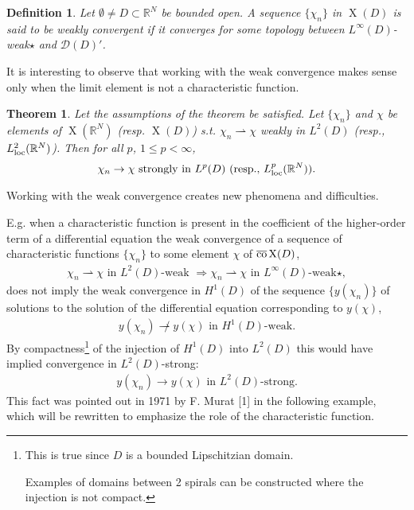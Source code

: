 \documentclass{book}
\numberwithin{equation}{section}
\newtheorem{definition}{Definition}[section]
\newtheorem{theorem}{Theorem}[section]
\begin{document}
\begin{enumerate}
    \begin{definition}
        Let $\emptyset\ne D\subset\mathbb{R}^N$ be bounded open. A sequence $\{\chi_n\}$ in $\operatorname{X}(D)$ is said to be \emph{weakly convergent} if it converges for some topology between $L^\infty(D)$-weak$\star$ and $\mathcal{D}(D)'$.
    \end{definition}
    It is interesting to observe that working with the weak convergence makes sense only when the limit element is not a characteristic function.
    
    \begin{theorem}
        Let the assumptions of the theorem be satisfied. Let $\{\chi_n\}$ and $\chi$ be elements of $\operatorname{X}(\mathbb{R}^N)$ (resp. $\operatorname{X}(D)$) s.t. $\chi_n\rightharpoonup\chi$ weakly in $L^2(D)$ (resp., $L_{\rm loc}^2(\mathbb{R}^N)$). Then for all $p$, $1\le p < \infty$,
        \begin{align*}
            \chi_n\to\chi \mbox{ strongly in } L^p(D) \mbox{ (resp., } L_{\rm loc}^p(\mathbb{R}^N)).
        \end{align*}
    \end{theorem}
    Working with the weak convergence creates new phenomena and difficulties.
    
    E.g. when a characteristic function is present in the coefficient of the higher-order term of a differential equation the weak convergence of a sequence of characteristic functions $\{\chi_n\}$ to some element $\chi$ of $\overline{\rm co}\operatorname{X}(D)$,
    \begin{align*}
        \chi_n\rightharpoonup\chi \mbox{ in } L^2(D)\mbox{-weak }\Rightarrow\chi_n\rightharpoonup\chi \mbox{ in } L^\infty(D)\mbox{-weak}\star,
    \end{align*}
    does not imply the weak convergence in $H^1(D)$ of the sequence $\{y(\chi_n)\}$ of solutions to the solution of the differential equation corresponding to $y(\chi)$,
    \begin{align*}
        y(\chi_n)\not\rightharpoonup y(\chi) \mbox{ in } H^1(D)\mbox{-weak}.
    \end{align*}
    By compactness\footnote{This is true since $D$ is a bounded Lipschitzian domain.
        
        Examples of domains between 2 spirals can be constructed where the injection is not compact.} of the injection of $H^1(D)$ into $L^2(D)$ this would have implied convergence in $L^2(D)$-strong:
    \begin{align*}
        y(\chi_n)\to y(\chi) \mbox{ in } L^2(D)\mbox{-strong}.
    \end{align*}
    This fact was pointed out in 1971 by F. Murat [1] in the following example, which will be rewritten to emphasize the role of the characteristic function.
    

\end{enumerate}
\end{document}
